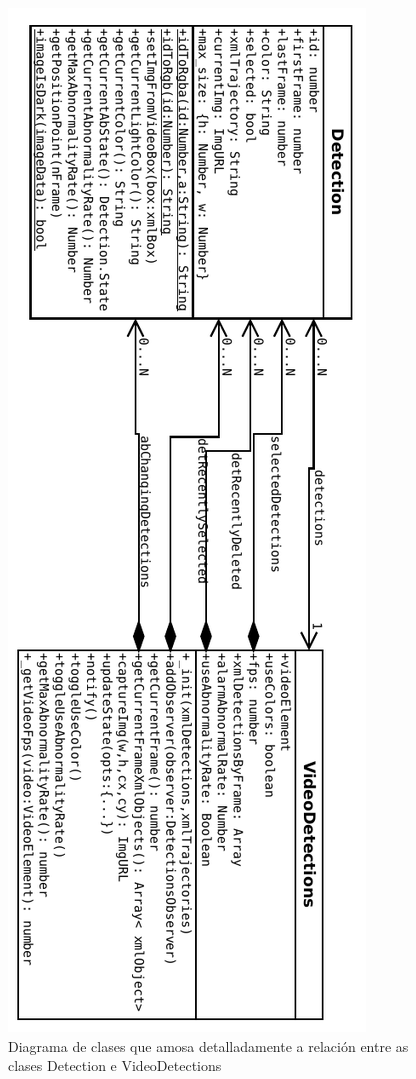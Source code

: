         \begin{figure}[htp]
        \begin{center}
            \includegraphics[scale=1]{figures/Detection-VideoDetections.pdf}
            \caption{Diagrama de clases que amosa detalladamente a relación entre as clases Detection
            e VideoDetections}
        \label{fig:Detection-VideoDetections}
        \end{center}
        \end{figure}
        
